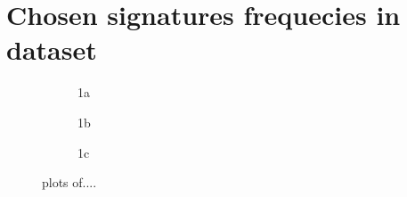 \chapter{Chosen signatures frequecies in dataset} \label{app:frequecies}

\begin{figure}
    \centering
    \begin{subfigure}{.33\textwidth}
      \centering
      \caption{1a}
      \label{fig:sfig1}
    \end{subfigure}%
    \begin{subfigure}{.33\textwidth}
      \centering
      \caption{1b}
      \label{fig:sfig2}
    \end{subfigure}
    \begin{subfigure}{.33\textwidth}
        \centering
        \caption{1c}
        \label{fig:sfig3}
    \end{subfigure}
    \caption{plots of....}
    \label{fig:fig}
\end{figure}